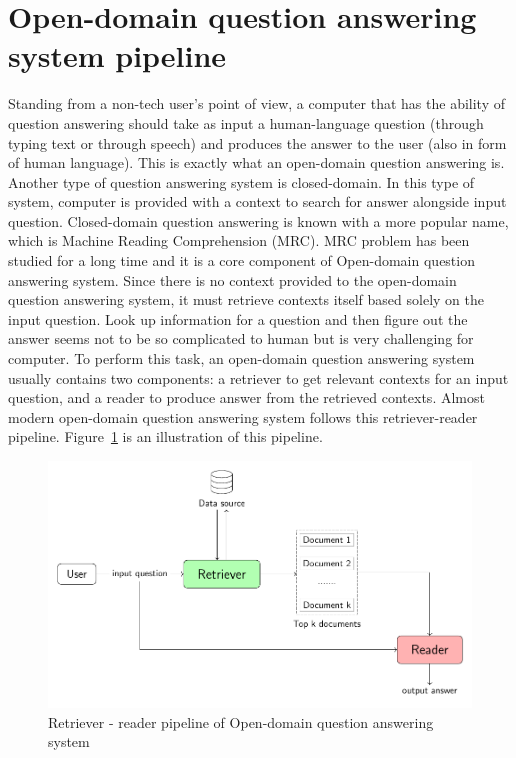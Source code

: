 \documentclass[12pt, sort&compress]{report}
\begin{document}
\section{Open-domain question answering system pipeline}
Standing from a non-tech user's point of view, a computer that has the ability of question answering should take as input a human-language question (through typing text or through speech) and produces the answer to the user (also in form of human language). This is exactly what an open-domain question answering is. Another type of question answering system is closed-domain. In this type of system, computer is provided with a context to search for answer alongside input question. Closed-domain question answering is known with a more popular name, which is Machine Reading Comprehension (MRC). MRC problem has been studied for a long time and it is a core component of Open-domain question answering system. Since there is no context provided to the open-domain question answering system, it must retrieve contexts itself based solely on the input question. Look up information for a question and then figure out the answer seems not to be so complicated to human but is very challenging for computer. To perform this task, an open-domain question answering system usually contains two components: a retriever to get relevant contexts for an input question, and a reader to produce answer from the retrieved contexts. Almost modern open-domain question answering system follows this retriever-reader pipeline. Figure~\ref{fig:01} is an illustration of this pipeline. 
\begin{figure}[!htbp]
	\centering
	\includegraphics[scale=.8]{images/PDF/overall_arch/architecture.pdf}
	\caption{Retriever - reader pipeline of Open-domain question answering system}
	\label{fig:01}
\end{figure}
\end{document}
